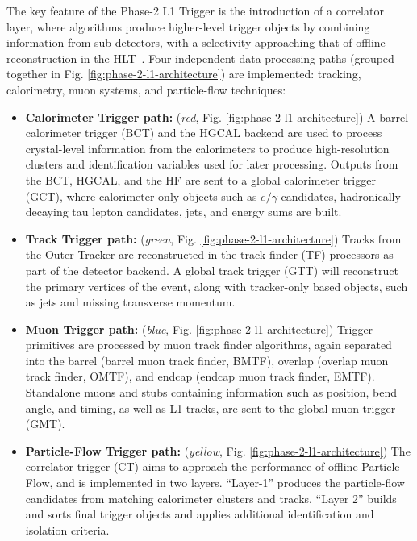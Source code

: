 The key feature of the Phase-2 L1 Trigger is the introduction of a correlator layer, where algorithms produce higher-level trigger objects by combining information from sub-detectors, with a selectivity approaching that of offline reconstruction in the HLT~\cite{CMS-TDR-021}. Four independent data processing paths (grouped together in Fig. \ref{fig:phase-2-l1-architecture}) are implemented: tracking, calorimetry, muon systems, and particle-flow techniques:
\begin{itemize}
    \item \textbf{Calorimeter Trigger path:} (\textit{red}, Fig. \ref{fig:phase-2-l1-architecture}) A barrel calorimeter trigger (BCT) and the HGCAL backend are used to process crystal-level information from the calorimeters to produce high-resolution clusters and identification variables used for later processing. Outputs from the BCT, HGCAL, and the HF are sent to a global calorimeter trigger (GCT), where calorimeter-only objects such as $e/\gamma$ candidates, hadronically decaying tau lepton candidates, jets, and energy sums are built.
    \item \textbf{Track Trigger path:} (\textit{green}, Fig. \ref{fig:phase-2-l1-architecture}) Tracks from the Outer Tracker are reconstructed in the track finder (TF) processors as part of the detector backend. A global track trigger (GTT) will reconstruct the primary vertices of the event, along with tracker-only based objects, such as jets and missing transverse momentum.
    \item \textbf{Muon Trigger path:} (\textit{blue}, Fig. \ref{fig:phase-2-l1-architecture}) Trigger primitives are processed by muon track finder algorithms, again separated into the barrel (barrel muon track finder, BMTF), overlap (overlap muon track finder, OMTF), and endcap (endcap muon track finder, EMTF). Standalone muons and stubs containing information such as position, bend angle, and timing, as well as L1 tracks, are sent to the global muon trigger (GMT).
    \item \textbf{Particle-Flow Trigger path:} (\textit{yellow}, Fig. \ref{fig:phase-2-l1-architecture}) The correlator trigger (CT) aims to approach the performance of offline Particle Flow, and is implemented in two layers. ``Layer-1'' produces the particle-flow candidates from matching calorimeter clusters and tracks. ``Layer 2'' builds and sorts final trigger objects and applies additional identification and isolation criteria.
\end{itemize}


